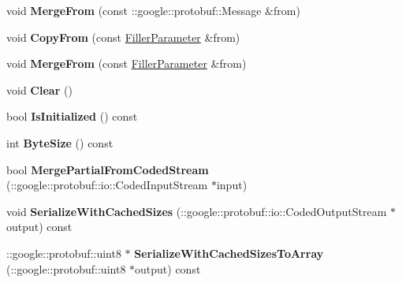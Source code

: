 \begin{DoxyCompactItemize}
void {\bfseries Merge\+From} (const \+::google\+::protobuf\+::\+Message \&from)
\item 
\mbox{\label{classcaffe_1_1_filler_parameter_a483c3add5432f3e53ebbed1c9aba43ba}} 
void {\bfseries Copy\+From} (const \mbox{\hyperlink{classcaffe_1_1_filler_parameter}{Filler\+Parameter}} \&from)
\item 
\mbox{\label{classcaffe_1_1_filler_parameter_af51ffc9dc0d090285894295423f9b967}} 
void {\bfseries Merge\+From} (const \mbox{\hyperlink{classcaffe_1_1_filler_parameter}{Filler\+Parameter}} \&from)
\item 
\mbox{\label{classcaffe_1_1_filler_parameter_ac0d9a7f72c87b111eded97a4b1674c45}} 
void {\bfseries Clear} ()
\item 
\mbox{\label{classcaffe_1_1_filler_parameter_acf315169e0a4d721188a39595375d13e}} 
bool {\bfseries Is\+Initialized} () const
\item 
\mbox{\label{classcaffe_1_1_filler_parameter_ab37c78d2b114bd36863388ba40103b55}} 
int {\bfseries Byte\+Size} () const
\item 
\mbox{\label{classcaffe_1_1_filler_parameter_aeb6ee96d3e880e7325ebf0c0147b42d4}} 
bool {\bfseries Merge\+Partial\+From\+Coded\+Stream} (\+::google\+::protobuf\+::io\+::\+Coded\+Input\+Stream $\ast$input)
\item 
\mbox{\label{classcaffe_1_1_filler_parameter_a6088e584c41faedfaf2d8ed95423b5b1}} 
void {\bfseries Serialize\+With\+Cached\+Sizes} (\+::google\+::protobuf\+::io\+::\+Coded\+Output\+Stream $\ast$output) const
\item 
\mbox{\label{classcaffe_1_1_filler_parameter_a0cff8f4ea9202a82ac0c086aaf6875b2}} 
\+::google\+::protobuf\+::uint8 $\ast$ {\bfseries Serialize\+With\+Cached\+Sizes\+To\+Array} (\+::google\+::protobuf\+::uint8 $\ast$output) const
\item 
\mbox{\label{classcaffe_1_1_filler_parameter_a27645c4a7291fd3236f8bf7bee76c28f}} 

\end{DoxyCompactItemize}
